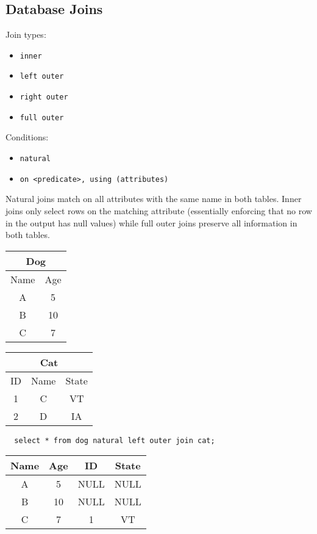 \documentclass{math}
\begin{document}
\subsection*{Database Joins}
Join types:
\begin{itemize}
  \item \texttt{inner}
  \item \texttt{left outer}
  \item \texttt{right outer}
  \item \texttt{full outer}
\end{itemize}
Conditions:
\begin{itemize}
  \item \texttt{natural}
  \item \texttt{on \textless predicate\textgreater, using (attributes)}
\end{itemize}
Natural joins match on all attributes with the same name in both tables. Inner
joins only select rows on the matching attribute (essentially enforcing that
no row in the output has null values) while full outer joins preserve all
information in both tables.
\begin{center}
  \begin{tabular}{|c|c|}
    \hline
    \multicolumn{2}{|c|}{Dog} \\
    \hline
    Name & Age \\
    \hline
    A & 5 \\
    B & 10 \\
    C & 7 \\
    \hline
  \end{tabular}
  \begin{tabular}{|c|c|c|}
    \hline
    \multicolumn{3}{|c|}{Cat} \\
    \hline
    ID & Name & State \\
    \hline
    1 & C & VT \\
    2 & D & IA \\
    \hline
  \end{tabular}
\end{center}
\begin{lstlisting}
  select * from dog natural left outer join cat;
\end{lstlisting}
\begin{center}
  \begin{tabular}{|c|c|c|c|}
    \hline
    Name & Age & ID & State \\
    \hline
    A & 5 & NULL & NULL \\
    B & 10 & NULL & NULL \\
    C & 7 & 1 & VT \\
    \hline
  \end{tabular}
\end{center}
\end{document}
